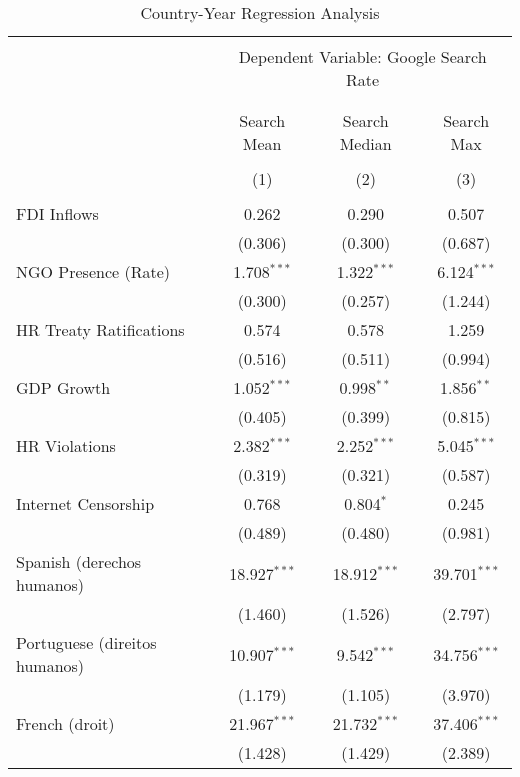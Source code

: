 
\begin{table}[!htbp] \centering 
  \caption{Country-Year Regression Analysis} 
  \label{} 
\begin{tabular}{@{\extracolsep{5pt}}lccc} 
\\[-1.8ex]\hline 
\hline \\[-1.8ex] 
 & \multicolumn{3}{c}{Dependent Variable: Google Search Rate} \\ 
\cline{2-4} 
\\[-1.8ex] & \multicolumn{3}{c}{ } \\ 
 & Search Mean & Search Median & Search Max \\ 
\\[-1.8ex] & (1) & (2) & (3)\\ 
\hline \\[-1.8ex] 
 FDI Inflows & 0.262 & 0.290 & 0.507 \\ 
  & (0.306) & (0.300) & (0.687) \\ 
  NGO Presence (Rate) & 1.708$^{***}$ & 1.322$^{***}$ & 6.124$^{***}$ \\ 
  & (0.300) & (0.257) & (1.244) \\ 
  HR Treaty Ratifications & 0.574 & 0.578 & 1.259 \\ 
  & (0.516) & (0.511) & (0.994) \\ 
  GDP Growth & 1.052$^{***}$ & 0.998$^{**}$ & 1.856$^{**}$ \\ 
  & (0.405) & (0.399) & (0.815) \\ 
  HR Violations & 2.382$^{***}$ & 2.252$^{***}$ & 5.045$^{***}$ \\ 
  & (0.319) & (0.321) & (0.587) \\ 
  Internet Censorship & 0.768 & 0.804$^{*}$ & 0.245 \\ 
  & (0.489) & (0.480) & (0.981) \\ 
  Spanish (derechos humanos) & 18.927$^{***}$ & 18.912$^{***}$ & 39.701$^{***}$ \\ 
  & (1.460) & (1.526) & (2.797) \\ 
  Portuguese (direitos humanos) & 10.907$^{***}$ & 9.542$^{***}$ & 34.756$^{***}$ \\ 
  & (1.179) & (1.105) & (3.970) \\ 
  French (droit) & 21.967$^{***}$ & 21.732$^{***}$ & 37.406$^{***}$ \\ 
  & (1.428) & (1.429) & (2.389) \\ 

\end{tabular}
\end{table}
